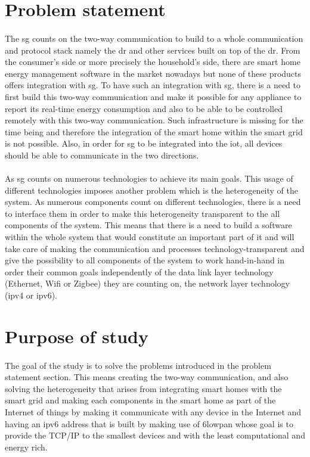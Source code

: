 \documentclass[oneside,12pt,a4paper,final]{book}
\begin{document}
\section{Problem statement}
\paragraph{}
The  \gls{sg} counts on the two-way communication to build to a whole communication and protocol stack namely the \gls{dr} and other services built on top of the \gls{dr}. From the consumer's side or more precisely the household's side, there are smart home energy management software in the market nowadays but none of these products offers integration with \gls{sg}. To have such an integration with \gls{sg}, there is a need to first build this two-way communication and make it possible for any appliance to report its real-time energy consumption and also to be able to be controlled remotely with this two-way communication. Such infrastructure is missing for the time being and therefore the integration of the smart home within the smart grid is not possible. Also, in order for \gls{sg} to be integrated into the \gls{iot}, all devices should be able to communicate in the two directions.
\paragraph{}
As \gls{sg} counts on numerous technologies to achieve its main goals. This usage of different technologies imposes another problem which is the heterogeneity of the system. As numerous components count on different technologies, there is a need to interface them in order to make this heterogeneity transparent to the all components of the system. This means that there is a need to build a software within the whole system that would constitute an important part of it and will take care of making the communication and processes technology-transparent and give the possibility to all components of the system to work hand-in-hand in order their common goals independently of the data link layer technology (Ethernet, Wifi or Zigbee) they are counting on, the network layer technology (\gls{ipv4} or \gls{ipv6}).

\section{Purpose of study}
 \paragraph{}
The goal of the study is to solve the problems introduced in the problem statement section. This means creating the two-way communication, and also solving the heterogeneity that arises from integrating smart homes with the smart grid and making each components in the smart home as part of the Internet of things by making it communicate with any device in the Internet and having an \gls{ipv6} address that is built by making use of \gls{6lowpan} whose goal is to provide the TCP/IP to the smallest devices and with the least computational and energy rich.
\end{document}
